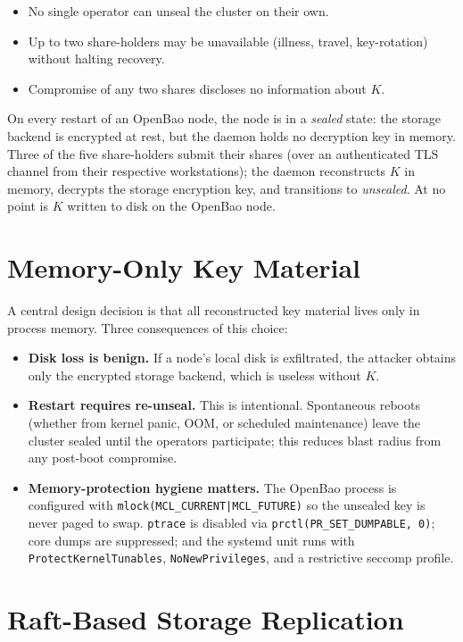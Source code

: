 \documentclass[12pt,a4paper,oneside]{report}
\begin{document}
\begin{itemize}[leftmargin=*]
    \item No single operator can unseal the cluster on their own.
    \item Up to two share-holders may be unavailable (illness, travel, key-rotation) without halting recovery.
    \item Compromise of any two shares discloses no information about $K$.
\end{itemize}

On every restart of an OpenBao node, the node is in a \emph{sealed} state: the storage backend is encrypted at rest, but the daemon holds no decryption key in memory. Three of the five share-holders submit their shares (over an authenticated TLS channel from their respective workstations); the daemon reconstructs $K$ in memory, decrypts the storage encryption key, and transitions to \emph{unsealed}. At no point is $K$ written to disk on the OpenBao node.

\section{Memory-Only Key Material}

A central design decision is that all reconstructed key material lives only in process memory. Three consequences of this choice:

\begin{itemize}[leftmargin=*]
    \item \textbf{Disk loss is benign.} If a node's local disk is exfiltrated, the attacker obtains only the encrypted storage backend, which is useless without $K$.
    \item \textbf{Restart requires re-unseal.} This is intentional. Spontaneous reboots (whether from kernel panic, OOM, or scheduled maintenance) leave the cluster sealed until the operators participate; this reduces blast radius from any post-boot compromise.
    \item \textbf{Memory-protection hygiene matters.} The OpenBao process is configured with \texttt{mlock(MCL\_CURRENT|MCL\_FUTURE)} so the unsealed key is never paged to swap. \texttt{ptrace} is disabled via \texttt{prctl(PR\_SET\_DUMPABLE, 0)}; core dumps are suppressed; and the systemd unit runs with \texttt{ProtectKernelTunables}, \texttt{NoNewPrivileges}, and a restrictive seccomp profile.
\end{itemize}

\section{Raft-Based Storage Replication}
\end{document}
